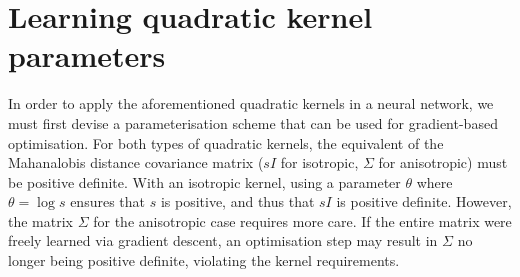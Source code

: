 \documentclass[a4paper, 12pt]{report}
\begin{document}
\section{Learning quadratic kernel parameters}
\label{sec:learning-pdm}
In order to apply the aforementioned quadratic kernels in a neural network, we must first devise a parameterisation scheme that can be used for gradient-based optimisation. For both types of quadratic kernels, the equivalent of the Mahanalobis distance covariance matrix ($sI$ for isotropic, $\Sigma$ for anisotropic) must be positive definite. With an isotropic kernel, using a parameter $\theta$ where $\theta = \log s$ ensures that $s$ is positive, and thus that $sI$ is positive definite. However, the matrix $\Sigma$ for the anisotropic case requires more care. If the entire matrix were freely learned via gradient descent, an optimisation step may result in $\Sigma$ no longer being positive definite, violating the kernel requirements.
\end{document}
